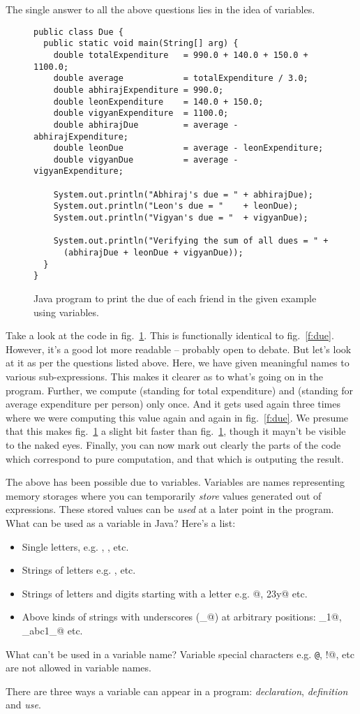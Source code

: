 \documentclass[12pt,a4paper]{article}
\begin{document}
The single answer to all the above questions lies in the idea of variables.
\begin{figure}[H]
\begin{lstlisting}[frame=single]
public class Due {
  public static void main(String[] arg) {
    double totalExpenditure   = 990.0 + 140.0 + 150.0 + 1100.0;
    double average            = totalExpenditure / 3.0;
    double abhirajExpenditure = 990.0;
    double leonExpenditure    = 140.0 + 150.0;
    double vigyanExpenditure  = 1100.0;
    double abhirajDue         = average - abhirajExpenditure;
    double leonDue            = average - leonExpenditure;
    double vigyanDue          = average - vigyanExpenditure;
    
    System.out.println("Abhiraj's due = " + abhirajDue);
    System.out.println("Leon's due = "    + leonDue);
    System.out.println("Vigyan's due = "  + vigyanDue);

    System.out.println("Verifying the sum of all dues = " + 
      (abhirajDue + leonDue + vigyanDue));
  }
}
\end{lstlisting}
\caption{Java program to print the due of each friend in the given example using variables.}
\label{f:due2}
\end{figure}

Take a look at the code in fig.~\ref{f:due2}. This is functionally identical to fig.~\ref{f:due}. However, it's a good lot more readable -- probably open to debate. But let's look at it as per the questions listed above. Here, we have given meaningful names to various sub-expressions. This makes it clearer as to what's going on in the program. Further, we compute \lstinline@totalExpenditure@ (standing for total expenditure) and \lstinline@average@ (standing for average expenditure per person) only once. And it gets used again three times where we were computing this value again and again in fig.~\ref{f:due}. We presume that this makes fig.~\ref{f:due2} a slight bit faster than fig.~\ref{f:due2}, though it mayn't be visible to the naked eyes. Finally, you can now mark out clearly the parts of the code which correspond to pure computation, and that which is outputing the result.

The above has been possible due to variables. Variables are names representing memory storages where you can temporarily \emph{store} values generated out of expressions. These stored values can be \emph{used} at a later point in the program. What can be used as a variable in Java? Here's a list:
\begin{itemize}
	\item Single letters, e.g. \lstinline@x@, \lstinline@y@, \lstinline@z@ etc.
	\item Strings of letters e.g. \lstinline@abc@, \lstinline@XyZ@ etc.
	\item Strings of letters and digits starting with a letter e.g. @, \lstinline@z23y@ etc.
	\item Above kinds of strings with underscores (\lstinline@_@) at arbitrary positions: \lstinline@abc_1@, \lstinline@_abc1_@ etc.  
\end{itemize}

What can't be used in a variable name? Variable special characters e.g. \lstinline!@!, \lstinline@!@, etc are not allowed in variable names.

There are three ways a variable can appear in a program: \emph{declaration}, \emph{definition} and \emph{use}.
\end{document}
